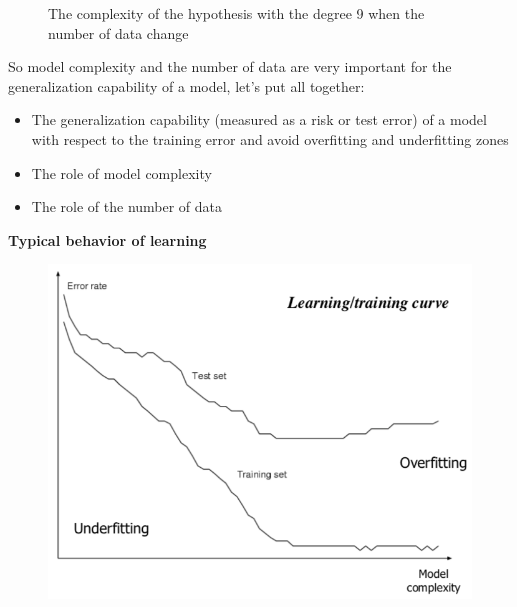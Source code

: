 \documentclass[../main.tex]{subfiles}
\begin{document}
\begin{figure}[h]
  \centering
  \hfill
  \caption{The complexity of the hypothesis with the degree 9 when the number of data change}
\end{figure}

\noindent So model complexity and the number of data are very important for the generalization capability of a model, let's put all together:
\begin{itemize}
    \item The generalization capability (measured as a risk or test error) of a model with respect to the training error and avoid overfitting and underfitting zones
    \item The role of model complexity
    \item The role of the number of data
\end{itemize}
\newpage
\noindent\textbf{Typical behavior of learning}
\begin{figure}[H]
    \centering
    \includegraphics[scale = 0.4]{lectures/1_Introduction/intro_behavior_of_learning.png}
\end{figure}
\end{document}
